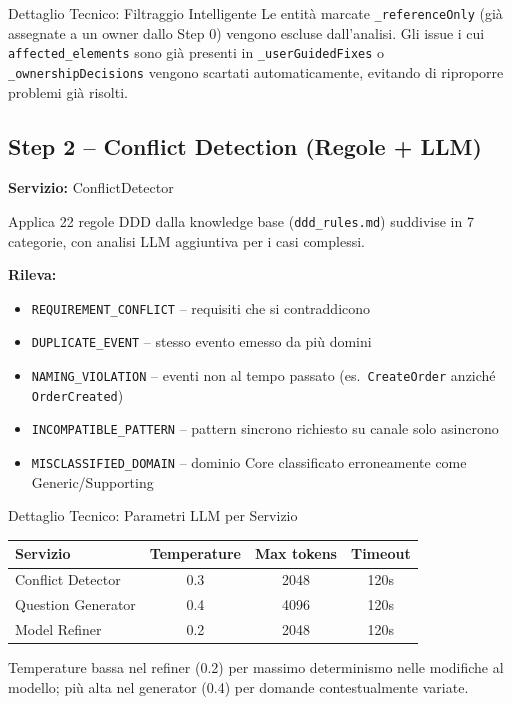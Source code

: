 \documentclass[12pt,a4paper]{report}
\begin{document}
\begin{technicalbox}{Dettaglio Tecnico: Filtraggio Intelligente}
Le entità marcate \texttt{\_referenceOnly} (già assegnate a un owner dallo Step 0)
vengono escluse dall'analisi. Gli issue i cui \texttt{affected\_elements}
sono già presenti in \texttt{\_userGuidedFixes} o \texttt{\_ownershipDecisions}
vengono scartati automaticamente, evitando di riproporre problemi già risolti.
\end{technicalbox}

\subsection{Step 2 -- Conflict Detection (Regole + LLM)}

\textbf{Servizio:} ConflictDetector

Applica 22 regole DDD dalla knowledge base (\texttt{ddd\_rules.md}) suddivise
in 7 categorie, con analisi LLM aggiuntiva per i casi complessi.

\textbf{Rileva:}
\begin{itemize}
  \item \texttt{REQUIREMENT\_CONFLICT} -- requisiti che si contraddicono
  \item \texttt{DUPLICATE\_EVENT} -- stesso evento emesso da più domini
  \item \texttt{NAMING\_VIOLATION} -- eventi non al tempo passato
        (es.\ \texttt{CreateOrder} anziché \texttt{OrderCreated})
  \item \texttt{INCOMPATIBLE\_PATTERN} -- pattern sincrono richiesto su
        canale solo asincrono
  \item \texttt{MISCLASSIFIED\_DOMAIN} -- dominio Core classificato
        erroneamente come Generic/Supporting
\end{itemize}

\begin{technicalbox}{Dettaglio Tecnico: Parametri LLM per Servizio}
\begin{center}
\begin{tabular}{lccc}
\toprule
Servizio & Temperature & Max tokens & Timeout \\
\midrule
Conflict Detector & 0.3 & 2048 & 120s \\
Question Generator & 0.4 & 4096 & 120s \\
Model Refiner & 0.2 & 2048 & 120s \\
\bottomrule
\end{tabular}
\end{center}
Temperature bassa nel refiner (0.2) per massimo determinismo nelle
modifiche al modello; più alta nel generator (0.4) per domande contestualmente
variate.
\end{technicalbox}
\end{document}
